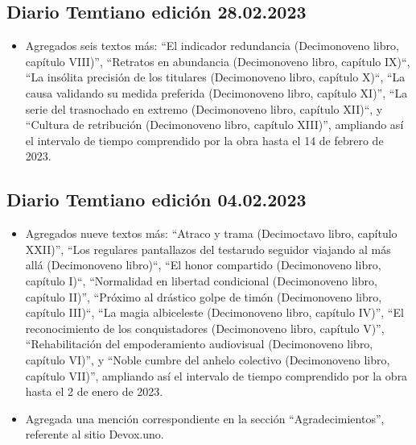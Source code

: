 \documentclass[
]{book}
\providecommand{\tightlist}{%
  \setlength{\itemsep}{0pt}\setlength{\parskip}{0pt}}
\begin{document}
\hypertarget{diario-temtiano-ediciuxf3n-28.02.2023}{%
\subsection*{Diario Temtiano edición 28.02.2023}\label{diario-temtiano-ediciuxf3n-28.02.2023}}

\begin{itemize}
\tightlist
\item
  Agregados seis textos más: ``El indicador redundancia (Decimonoveno libro, capítulo VIII)'', ``Retratos en abundancia (Decimonoveno libro, capítulo IX)``, ``La insólita precisión de los titulares (Decimonoveno libro, capítulo X)``, ``La causa validando su medida preferida (Decimonoveno libro, capítulo XI)'', ``La serie del trasnochado en extremo (Decimonoveno libro, capítulo XII)``, y ``Cultura de retribución (Decimonoveno libro, capítulo XIII)'', ampliando así el intervalo de tiempo comprendido por la obra hasta el 14 de febrero de 2023.
\end{itemize}

\hypertarget{diario-temtiano-ediciuxf3n-04.02.2023}{%
\subsection*{Diario Temtiano edición 04.02.2023}\label{diario-temtiano-ediciuxf3n-04.02.2023}}

\begin{itemize}
\item
  Agregados nueve textos más: ``Atraco y trama (Decimoctavo libro, capítulo XXII)'', ``Los regulares pantallazos del testarudo seguidor viajando al más allá (Decimonoveno libro)``, ``El honor compartido (Decimonoveno libro, capítulo I)``, ``Normalidad en libertad condicional (Decimonoveno libro, capítulo II)'', ``Próximo al drástico golpe de timón (Decimonoveno libro, capítulo III)``, ``La magia albiceleste (Decimonoveno libro, capítulo IV)'', ``El reconocimiento de los conquistadores (Decimonoveno libro, capítulo V)'', ``Rehabilitación del empoderamiento audiovisual (Decimonoveno libro, capítulo VI)'', y ``Noble cumbre del anhelo colectivo (Decimonoveno libro, capítulo VII)'', ampliando así el intervalo de tiempo comprendido por la obra hasta el 2 de enero de 2023.
\item
  Agregada una mención correspondiente en la sección ``Agradecimientos'', referente al sitio Devox.uno.
\end{itemize}
\end{document}
